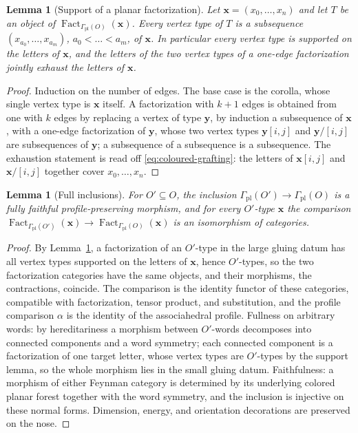\documentclass[11pt,letterpaper,twoside]{article}
\theoremstyle{plain}
\newtheorem{lemma}[theorem]{Lemma}
\theoremstyle{definition}
\theoremstyle{remark}
\DeclareMathOperator{\Fact}{Fact}
\begin{document}
\begin{lemma}[Support of a planar factorization]\label{lem:planar-support}
Let \(\mathbf x=(x_0,\dots,x_n)\) and let \(T\) be an object of \(\Fact_{\Gamma_{\mathrm{pl}}(O)}(\mathbf x)\).  Every vertex type of \(T\) is a subsequence \((x_{a_0},\dots,x_{a_m})\), \(a_0<\dots<a_m\), of \(\mathbf x\).  In particular every vertex type is supported on the letters of \(\mathbf x\), and the letters of the two vertex types of a one-edge factorization jointly exhaust the letters of \(\mathbf x\).
\end{lemma}

\begin{proof}
Induction on the number of edges.  The base case is the corolla, whose single vertex type is \(\mathbf x\) itself.  A factorization with \(k+1\) edges is obtained from one with \(k\) edges by replacing a vertex of type \(\mathbf y\), by induction a subsequence of \(\mathbf x\), with a one-edge factorization of \(\mathbf y\), whose two vertex types \(\mathbf y[i,j]\) and \(\mathbf y/[i,j]\) are subsequences of \(\mathbf y\); a subsequence of a subsequence is a subsequence.  The exhaustion statement is read off \eqref{eq:coloured-grafting}: the letters of \(\mathbf x[i,j]\) and \(\mathbf x/[i,j]\) together cover \(x_0,\dots,x_n\).
\end{proof}

\begin{lemma}[Full inclusions]\label{lem:planar-full-inclusion}
For \(O'\subseteq O\), the inclusion \(\Gamma_{\mathrm{pl}}(O')\to\Gamma_{\mathrm{pl}}(O)\) is a fully faithful profile-preserving morphism, and for every \(O'\)-type \(\mathbf x\) the comparison \(\Fact_{\Gamma_{\mathrm{pl}}(O')}(\mathbf x)\to\Fact_{\Gamma_{\mathrm{pl}}(O)}(\mathbf x)\) is an isomorphism of categories.
\end{lemma}

\begin{proof}
By Lemma~\ref{lem:planar-support}, a factorization of an \(O'\)-type in the large gluing datum has all vertex types supported on the letters of \(\mathbf x\), hence \(O'\)-types, so the two factorization categories have the same objects, and their morphisms, the contractions, coincide.  The comparison is the identity functor of these categories, compatible with factorization, tensor product, and substitution, and the profile comparison \(\alpha\) is the identity of the associahedral profile.  Fullness on arbitrary words: by hereditariness a morphism between \(O'\)-words decomposes into connected components and a word symmetry; each connected component is a factorization of one target letter, whose vertex types are \(O'\)-types by the support lemma, so the whole morphism lies in the small gluing datum.  Faithfulness: a morphism of either Feynman category is determined by its underlying colored planar forest together with the word symmetry, and the inclusion is injective on these normal forms.  Dimension, energy, and orientation decorations are preserved on the nose.
\end{proof}
\end{document}

